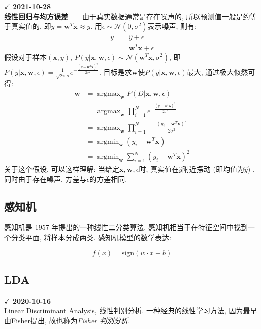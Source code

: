 \textbf{$\checkmark$ 2021-10-28}\\
\textbf{线性回归与均方误差}\ \ \ \
由于真实数据通常是存在噪声的, 所以预测值一般是约等于真实值的, 即$\hat{y} = \boldsymbol{w}^T \boldsymbol{x} \approx y$. 用$\epsilon \sim \mathcal{N}(0, \sigma^2)$表示噪声, 则有: 
\begin{align}
	y &= \hat{y} + \epsilon \nonumber \\
	  &= \boldsymbol{w}^T \boldsymbol{x} + \epsilon 	\nonumber
\end{align}
假设对于样本$(\boldsymbol{x}, y)$, $P(y | \boldsymbol{x}, \boldsymbol{w}, \epsilon) \sim \mathcal{N}(\boldsymbol{w}^T \boldsymbol{x}, \sigma^2)$, 即$P(y | \boldsymbol{x}, \boldsymbol{w}, \epsilon) = \frac{1}{\sqrt{2\pi} \sigma} e^{-\frac{(y - \boldsymbol{w}^T \boldsymbol{x})^2}{2 \sigma^2}}$. 目标是求$\boldsymbol{w}$使$P(y | \boldsymbol{x}, \boldsymbol{w}, \epsilon)$最大, 通过极大似然可得: 
\begin{align}
	\boldsymbol{w} &= \mathop{argmax}_{\boldsymbol{w}} P(D | \boldsymbol{x}, \boldsymbol{w}, \epsilon) \nonumber \\
		&= \mathop{argmax}_{\boldsymbol{w}} \prod_{i=1}^N e^{-\frac{(y - \boldsymbol{w}^T \boldsymbol{x})^2}{2 \sigma^2}} \nonumber \nonumber \\
		&= \mathop{argmax}_{\boldsymbol{w}} \prod_{i=1}^N -\frac{(y_i - \boldsymbol{w}^T \boldsymbol{x})^2}{2 \sigma^2} \nonumber \\
		&= \mathop{argmin}_{\boldsymbol{w}} (y_i - \boldsymbol{w}^T \boldsymbol{x}) \nonumber \\
		&= \mathop{argmin}_{\boldsymbol{w}} \sum_{i=1}^N (y_i - \boldsymbol{w}^T \boldsymbol{x})^2  \nonumber
\end{align}
关于这个假设, 可以这样理解: 当给定$\boldsymbol{x}, \boldsymbol{w}, \epsilon$时, 真实值在$\hat{y}$附近摆动 (即均值为$\hat{y}$) , 同时由于存在噪声, 方差与$\epsilon$的方差相同. 

\subsection{感知机}
感知机是 1957 年提出的一种线性二分类算法. 感知机相当于在特征空间中找到一个分类平面, 将样本分成两类. 感知机模型的数学表达:

$$
f(x) = \text{sign}(w \cdot x + b)
$$

\subsection{LDA}
\textbf{$\checkmark$ 2020-10-16}\\
Linear Discriminant Analysis, 线性判别分析. 一种经典的线性学习方法, 因为最早由Fisher提出, 故也称为\textit{Fisher 判别分析}. 

